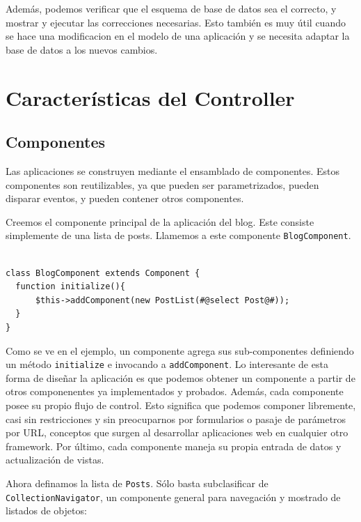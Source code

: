 Además, podemos verificar que el esquema de base de datos sea el correcto, y mostrar y ejecutar las correcciones necesarias. Esto también es muy útil cuando se hace una modificacion en el modelo de una aplicación y se necesita adaptar la base de datos a los nuevos cambios.

\section{Características del Controller}
\label{sec-controller}
\subsection{Componentes}
\label{sub-comp}

Las aplicaciones se construyen mediante el ensamblado de componentes. Estos componentes son reutilizables, ya que pueden ser parametrizados, pueden disparar eventos, y pueden contener otros componentes.

Creemos el componente principal de la aplicación del blog. Este consiste simplemente de una lista de posts. Llamemos a este componente \verb"BlogComponent".

\begin{verbatim}

class BlogComponent extends Component {
  function initialize(){
      $this->addComponent(new PostList(#@select Post@#));
  }
}
\end{verbatim}

Como se ve en el ejemplo, un componente agrega sus sub-componentes definiendo un método \verb"initialize" e invocando a \verb"addComponent". Lo interesante de esta forma de diseñar la aplicación es que podemos obtener un componente a partir de otros componenentes ya implementados y probados. Además, cada componente posee su propio flujo de control. Esto significa que podemos componer libremente, casi sin restricciones y sin preocuparnos por formularios o pasaje de parámetros por URL, conceptos que surgen al desarrollar aplicaciones web en cualquier otro framework. Por último, cada componente maneja su propia entrada de datos y actualización de vistas.

Ahora definamos la lista de \verb"Posts". Sólo basta subclasificar de \verb"CollectionNavigator", un componente general para navegación y mostrado de listados de objetos:

